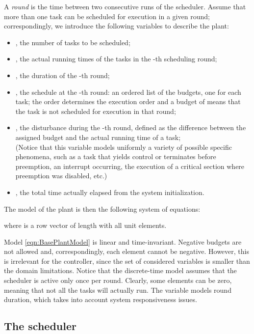 \documentclass[a4paper]{article}
\begin{document}
A \emph{round} is the time between two consecutive runs of the scheduler.
Assume that more than one task can be scheduled for execution in a given 
round; correspondingly, we introduce the following variables to describe the 
plant:
\begin{itemize}
\item , the number of tasks to be scheduled;
\item , the actual running times of the tasks in the -th
      scheduling round;
\item , the duration of the -th round;
\item , the schedule at the -th round: an ordered list of the budgets, one for each task; the order determines the execution order and a budget of  means that the task is not scheduled for execution in that round;
\item , the disturbance during the -th round, 
      defined as the difference between the assigned budget and the actual 
      running time of a task;\\
      (Notice that this variable models uniformly a variety of possible 
      specific phenomena, such as a task that yields control or terminates 
      before preemption, an interrupt occurring, the execution of a critical 
      section where preemption was disabled, etc.)
\item , the total time actually elapsed from the system 
      initialization.
\end{itemize}

The model of the plant is then the following system of equations:

where  is a row vector of length  with all unit elements.

Model \eqref{eqn:BasePlantModel} is linear and time-invariant. Negative budgets
are not allowed and, correspondingly, each  element cannot be
negative. However, this is irrelevant for the controller, since the set of
considered variables is smaller than the domain limitations. Notice that the
discrete-time model assumes that the scheduler is active only once per round.
Clearly, some  elements can be zero, meaning that not all the tasks will
actually run. The  variable models round duration, which takes into 
account system responsiveness issues.



\subsection{The scheduler}
\label{sec:scheduler}
\end{document}
